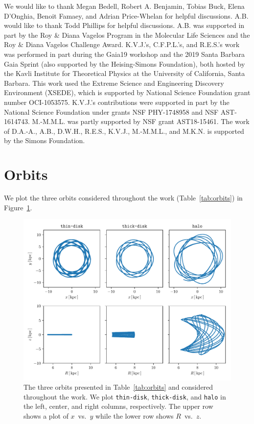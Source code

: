 \documentclass[twocolumn]{aastex62}
\newcommand{\thin}{\texttt{thin-disk}}
\newcommand{\thick}{\texttt{thick-disk}}
\newcommand{\halo}{\texttt{halo}}
\begin{document}
\acknowledgments
We would like to thank Megan Bedell, Robert A. Benjamin, Tobias Buck, Elena
D'Onghia, Benoit Famaey, and Adrian Price-Whelan for helpful discussions. A.B.
would like to thank Todd Phillips for helpful discussions. A.B. was supported
in part by the Roy \& Diana Vagelos Program in the Molecular Life Sciences and
the Roy \& Diana Vagelos Challenge Award. K.V.J.'s, C.F.P.L.'s, and R.E.S.'s work was
performed in part during the Gaia19 workshop and the 2019 Santa Barbara Gaia
Sprint (also supported by the Heising-Simons Foundation), both hosted by the
Kavli Institute for Theoretical Physics at the University of California, Santa
Barbara. This work used the Extreme Science and Engineering Discovery
Environment (XSEDE), which is supported by National Science Foundation grant
number OCI-1053575. K.V.J.'s contributions were supported in part by the
National Science Foundation under grants NSF PHY-1748958 and NSF AST-1614743.
M.-M.M.L. was partly supported by NSF grant AST18-15461. The work of D.A.-A.,
A.B., D.W.H., R.E.S., K.V.J., M.-M.M.L., and M.K.N. is supported by the Simons
Foundation.

\appendix
\section{Orbits} \label{app:orbits}
We plot the three orbits considered throughout the work
(Table~\ref{tab:orbits}) in Figure~\ref{fig:plot_orbits}.

\begin{figure}[htb!]
\begin{center}
\includegraphics[width=\textwidth]{fig/orbits.pdf}
\end{center}
\caption{The three orbits presented in Table~\ref{tab:orbits} and considered
throughout the work. We plot \thin{}, \thick{}, and \halo{} in the
left, center, and right columns, respectively. The upper row shows a plot of
$x$~vs.~$y$ while the lower row shows $R$~vs.~$z$.}
\label{fig:plot_orbits}
\end{figure}
\end{document}
